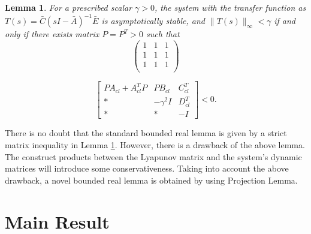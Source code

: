 \documentclass[journal,onecolumn]{IEEEtran}
\newtheorem{Lem}{Lemma}
\begin{document}
 \begin{Lem}\label{le3} For a prescribed scalar $\gamma>0$,
the system with the transfer function as
$T(s)=\bar{C}(sI-\bar{A})^{-1}\bar{E}$ is asymptotically stable, and
$\|T(s)\|_{\infty}<\gamma$ if and only if  there exists matrix
$P=P^T>0$
 such that
 \begin{equation}\label{Eq:Lem_33}\left(
   \begin{array}{ccc}
     1 & 1 & 1 \\
     1 & 1 & 1 \\
     1 & 1 & 1 \\
   \end{array}
 \right)
 \end{equation}


\begin{equation}\label{Eq:Lem_3}\left[
\begin{array}{cccc}
PA_{cl}+A_{cl}^TP&PB_{cl}&C_{cl}^T\\
{*}&-\gamma^2I&D_{cl}^T\\
{*}&{*}&-I
\end{array}\right]<0.
\end{equation}
 \end{Lem}



There is no doubt that the standard bounded real lemma is given by a
strict matrix inequality in Lemma \ref{le3}. However, there is a
drawback of the above lemma. The construct products between the
Lyapunov matrix and the system's dynamic matrices will introduce
some conservativeness. Taking into account the above drawback, a
novel bounded real lemma  is obtained by using Projection Lemma.








\section{ Main Result}
\end{document}
